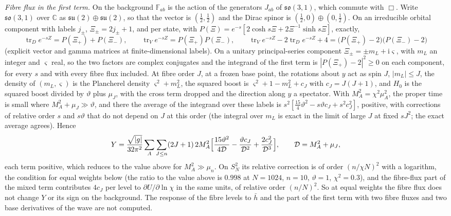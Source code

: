 \emph{Fibre flux in the first term.} On the background \(\mathbb F_{ab}\) is the action of the generators \(J_{ab}\) of \(\mathfrak{so}(3,1)\), which commute with \(\Box\). Write \(\mathfrak{so}(3,1)\) over \(\mathbb C\) as \(\mathfrak{su}(2)\oplus\mathfrak{su}(2)\), so that the vector is \((\tfrac12,\tfrac12)\) and the Dirac spinor is \((\tfrac12,0)\oplus(0,\tfrac12)\). On an irreducible orbital component with labels \(j_\pm\), \(\Xi_\pm=2j_\pm+1\), and per state, with \(P(\Xi)=e^{-s}[2\cosh s\Xi+2\Xi^{-1}\sinh s\Xi]\), exactly,
\[
\operatorname{tr}_De^{-sZ}=P(\Xi_+)+P(\Xi_-),\qquad
\operatorname{tr}_Ve^{-sZ}=P(\Xi_+)P(\Xi_-),\qquad
\operatorname{tr}_Ve^{-sZ}-2\operatorname{tr}_De^{-sZ}+4=\bigl(P(\Xi_+)-2\bigr)\bigl(P(\Xi_-)-2\bigr)
\]
(explicit vector and gamma matrices at finite-dimensional labels). On a unitary principal-series component \(\Xi_\pm=\pm m_L+\mathrm i\varsigma\), with \(m_L\) an integer and \(\varsigma\) real, so the two factors are complex conjugates and the integrand of the first term is \(|P(\Xi_+)-2|^2\ge0\) on each component, for every \(s\) and with every fibre flux included. At fibre order \(J\), at a frozen base point, the rotations about \(y\) act as spin \(J\), \(|m_L|\le J\), the density of \((m_L,\varsigma)\) is the Plancherel density \(\varsigma^2+m_L^2\), the squared boost is \(\varsigma^2+1-m_L^2+c_J\) with \(c_J=J(J+1)\), and \(H_0\) is the squared boost divided by \(\vartheta\) plus \(\mu_J\), with the cross term dropped and the direction along \(y\) a spectator. With \(M_A^2=\chi^2\mu_A^2\), the proper time is small where \(M_A^2+\mu_J\gg\vartheta\), and there the average of the integrand over these labels is \(s^2[\tfrac{15}4\vartheta^2-s\vartheta c_J+s^2c_J^2]\), positive, with corrections of relative order \(s\) and \(s\vartheta\) that do not depend on \(J\) at this order (the integral over \(m_L\) is exact in the limit of large \(J\) at fixed \(sJ^2\); the exact average agrees). Hence
\[
Y=\frac{\sqrt{|g|}}{32\pi^2}\sum_A\sum_{J\le n}(2J+1)\,2M_A^2\Bigl[\frac{15\vartheta^2}{4\mathcal D}-\frac{\vartheta c_J}{\mathcal D^2}+\frac{2c_J^2}{\mathcal D^3}\Bigr],\qquad\mathcal D=M_A^2+\mu_J,
\]
each term positive, which reduces to the value above for \(M_A^2\gg\mu_n\). On \(S^2_N\) its relative correction is of order \((n/\chi N)^2\) with a logarithm, the condition for equal weights below (the ratio to the value above is \(0.998\) at \(N=1024\), \(n=10\), \(\vartheta=1\), \(\chi^2=0.3\)), and the fibre-flux part of the mixed term contributes \(4c_J\) per level to \(\partial U/\partial\ln\chi\) in the same units, of relative order \((n/N)^2\). So at equal weights the fibre flux does not change \(Y\) or its sign on the background. The response of the fibre levels to \(\bar h\) and the part of the first term with two fibre fluxes and two base derivatives of the wave are not computed.

